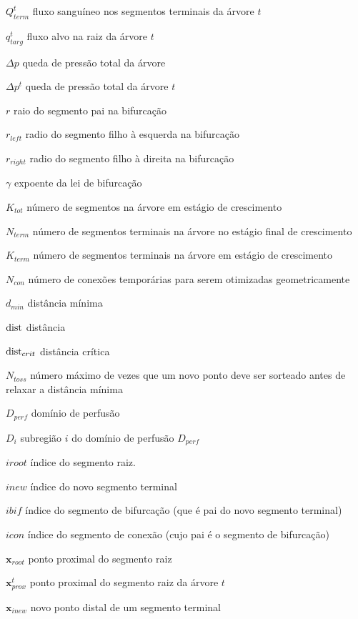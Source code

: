 \begin{simbolos}
  \item[$Q_{term}^t$] fluxo sanguíneo nos segmentos terminais da árvore $t$
  \item[$q_{targ}^t$] fluxo alvo na raiz da árvore $t$
  \item[$\Delta p$] queda de pressão total da árvore
  \item[$\Delta p^t$] queda de pressão total da árvore $t$
  \item[$r$] raio do segmento pai na bifurcação
  \item[$r_{left}$] radio do segmento filho à esquerda na bifurcação
  \item[$r_{right}$] radio do segmento filho à direita na bifurcação
  \item[$\gamma$] expoente da lei de bifurcação
  \item[$K_{tot}$] número de segmentos na árvore em estágio de crescimento
  \item[$N_{term}$] número de segmentos terminais na árvore no estágio final de crescimento
  \item[$K_{term}$] número de segmentos terminais na árvore em estágio de crescimento
  \item[$N_{con}$] número de conexões temporárias para serem otimizadas geometricamente
  \item[$d_{min}$] distância mínima
  \item[$\operatorname{dist}$] distância
  \item[$\operatorname{dist}_{crit}$] distância crítica
  \item[$N_{toss}$] número máximo de vezes que um novo ponto deve ser sorteado antes de relaxar a distância mínima
  \item[$D_{perf}$] domínio de perfusão
  \item[$D_i$] subregião $i$ do domínio de perfusão $D_{perf}$
  \item[$iroot$] índice do segmento raiz.
  \item[$inew$] índice do novo segmento terminal
  \item[$ibif$] índice do segmento de bifurcação (que é pai do novo segmento terminal)
  \item[$icon$] índice do segmento de conexão (cujo pai é o segmento de bifurcação)
  \item[$\mathbf{x}_{root}$] ponto proximal do segmento raiz
  \item[$\mathbf{x}_{prox}^t$] ponto proximal do segmento raiz da árvore $t$
  \item[$\mathbf{x}_{inew}$] novo ponto distal de um segmento terminal

\end{simbolos}
